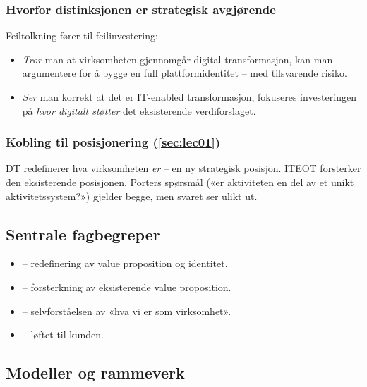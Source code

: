 \subsubsection*{Hvorfor distinksjonen er strategisk avgjørende}
Feiltolkning fører til feilinvestering:
\begin{itemize}
  \item \emph{Tror} man at virksomheten gjennomgår digital transformasjon, kan
    man argumentere for å bygge en full plattformidentitet -- med
    tilsvarende risiko.
  \item \emph{Ser} man korrekt at det er IT-enabled transformasjon, fokuseres
    investeringen på \emph{hvor digitalt støtter} det eksisterende
    verdiforslaget.
\end{itemize}

\subsubsection*{Kobling til posisjonering (\autoref{sec:lec01})}
DT redefinerer hva virksomheten \emph{er} -- en ny strategisk posisjon. ITEOT
forsterker den eksisterende posisjonen. Porters spørsmål («er aktiviteten en
del av et unikt aktivitetssystem?») gjelder begge, men svaret ser ulikt ut.

\subsection{Sentrale fagbegreper}
\begin{itemize}
  \item {} -- redefinering av value proposition og
    identitet.
  \item {} -- forsterkning av
    eksisterende value proposition.
  \item {} -- selvforståelsen av «hva vi er som
    virksomhet».
  \item {} -- løftet til kunden.
\end{itemize}

\subsection{Modeller og rammeverk}



